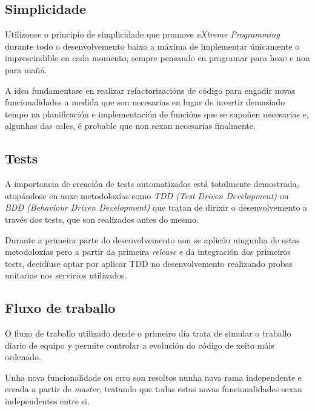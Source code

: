     \subsection{Simplicidade}
    Utilizouse o principio de simplicidade que promove \emph{eXtreme Programming}
    durante todo o desenvolvemento baixo a máxima de implementar únicamente o
    imprescindible en cada momento, sempre pensando en programar para hoxe e non para
    mañá.%

    A idea fundamentase en realizar refactorizacións de código para engadir 
novas funcionalidades a medida que son necesarias en lugar de invertir 
demasiado tempo na planificación e implementación de funcións que se supoñen 
necesarias e, algunhas das cales, é probable que non sexan necesarias 
finalmente.

    \subsection{Tests}
    A importancia de creación de tests automatizados está totalmente 
demostrada, atopándose en auxe metodoloxías como \emph{TDD (Test Driven 
Development)} ou \emph{BDD (Behaviour Driven Development)} que tratan de 
dirixir o desenvolvemento a través dos tests, que son realizados antes do mesmo.
    
    Durante a primeira parte do desenvolvemento non se aplicóu ningunha de 
estas metodoloxías pero a partir da primeira \emph{release} e da integración 
dos primeiros tests, decidíuse optar por aplicar TDD no desenvolvemento 
realizando probas unitarias nos servicios utilizados.

    \subsection{Fluxo de traballo}
    O fluxo de traballo utilizado dende o primeiro día trata de simular o 
traballo diario de equipo y permite controlar a evolución do código de xeito 
máis ordenado.
    
    Unha nova funcionalidade ou erro son resoltos nunha nova rama 
independente e creada a partir de \emph{master}, tratando que todas estas novas 
funcionalidades sexan independentes entre si.

